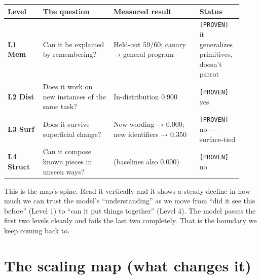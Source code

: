 \begin{longtable}[]{@{}
  >{\raggedright\arraybackslash}p{0.1400\linewidth}
>{\raggedright\arraybackslash}p{0.2800\linewidth}
>{\raggedright\arraybackslash}p{0.3400\linewidth}
>{\raggedright\arraybackslash}p{0.1600\linewidth}
@{}}
\toprule\noalign{}
\begin{minipage}[b]{\linewidth}\raggedright
Level
\end{minipage} & \begin{minipage}[b]{\linewidth}\raggedright
The question
\end{minipage} & \begin{minipage}[b]{\linewidth}\raggedright
Measured result
\end{minipage} & \begin{minipage}[b]{\linewidth}\raggedright
Status
\end{minipage} \\
\midrule\noalign{}
\endhead
\bottomrule\noalign{}
\endlastfoot
\textbf{L1 Mem} & Can it be explained by remembering? & Held-out 59/60;
canary → general program & \texttt{{[}PROVEN{]}} it generalizes
primitives, doesn't parrot \\
\textbf{L2 Dist} & Does it work on new instances of the same task? &
In-distribution 0.900 & \texttt{{[}PROVEN{]}} yes \\
\textbf{L3 Surf} & Does it survive superficial change? & New wording →
0.000; new identifiers → 0.350 & \texttt{{[}PROVEN{]}} no ---
surface-tied \\
\textbf{L4 Struct} & Can it compose known pieces in unseen ways? & 0.000
(baselines also 0.000) & \texttt{{[}PROVEN{]}} no \\
\end{longtable}

This is the map's spine. Read it vertically and it shows a steady
decline in how much we can trust the model's ``understanding'' as we
move from ``did it see this before'' (Level 1) to ``can it put things
together'' (Level 4). The model passes the first two levels cleanly and
fails the last two completely. That is the boundary we keep coming back
to.

\section{The scaling map (what changes
it)}\label{the-scaling-map-what-changes-it}


